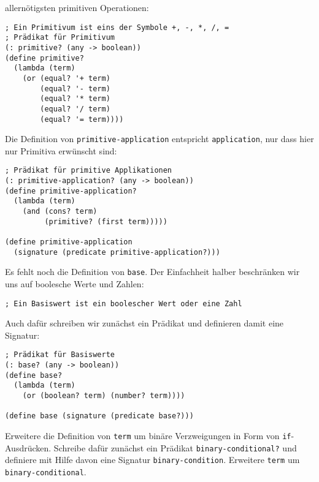allernötigsten primitiven Operationen:\label{page:primitivep}
%
\begin{lstlisting}
; Ein Primitivum ist eins der Symbole +, -, *, /, =
; Prädikat für Primitivum
(: primitive? (any -> boolean))
(define primitive?
  (lambda (term)
    (or (equal? '+ term)
        (equal? '- term)
        (equal? '* term)
        (equal? '/ term)
        (equal? '= term))))
\end{lstlisting}
%
Die Definition von \lstinline{primitive-application} entspricht
\lstinline{application}, nur dass hier nur Primitiva erwünscht sind:
%
\begin{lstlisting}
; Prädikat für primitive Applikationen
(: primitive-application? (any -> boolean))
(define primitive-application?
  (lambda (term)
    (and (cons? term)
         (primitive? (first term)))))

(define primitive-application 
  (signature (predicate primitive-application?)))
\end{lstlisting}
%
Es fehlt noch die Definition von \lstinline{base}.  Der Einfachheit
halber beschränken wir uns auf boolesche Werte und Zahlen:\label{page:basiswert}
%
\begin{lstlisting}
; Ein Basiswert ist ein boolescher Wert oder eine Zahl
\end{lstlisting}
%
Auch dafür schreiben wir zunächst ein Prädikat und definieren damit
eine Signatur:
%
\begin{lstlisting}
; Prädikat für Basiswerte
(: base? (any -> boolean))
(define base?
  (lambda (term)
    (or (boolean? term) (number? term))))

(define base (signature (predicate base?)))
\end{lstlisting}

\begin{aufgabeinline}
  Erweitere die Definition von \lstinline{term} um binäre
  Verzweigungen in Form von \lstinline{if}-Ausdrücken.  Schreibe dafür
  zunächst ein Prädikat \lstinline{binary-conditional?} und definiere
  mit Hilfe davon eine Signatur \lstinline{binary-condition}.
  Erweitere \lstinline{term} um \lstinline{binary-conditional}.
\end{aufgabeinline}

